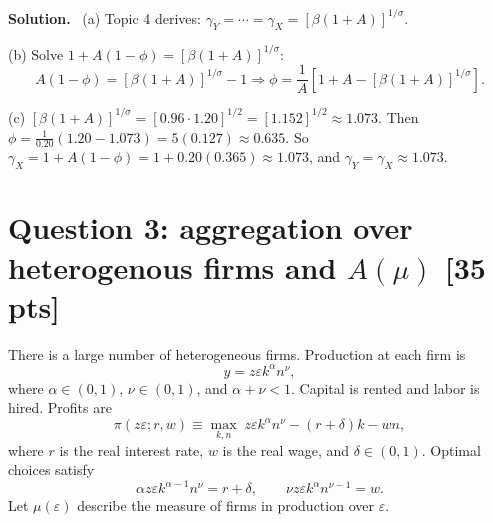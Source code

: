 \documentclass[12pt]{article}
\newenvironment{sol}{\par\medskip\noindent\textbf{Solution.}\ }{\par\medskip}
\newcommand{\pts}[1]{\hfill{\small[#1 pts]}}
\begin{document}
\begin{sol}
(a) Topic 4 derives: \(\gamma_Y=\cdots=\gamma_X=[\beta(1+A)]^{1/\sigma}\).

(b) Solve \(1+A(1-\phi)=[\beta(1+A)]^{1/\sigma}\):
\[
A(1-\phi)=[\beta(1+A)]^{1/\sigma}-1
\Rightarrow
\phi=\frac{1}{A}\left[1+A-[\beta(1+A)]^{1/\sigma}\right].
\]

(c) \([\beta(1+A)]^{1/\sigma}=[0.96\cdot 1.20]^{1/2}=[1.152]^{1/2}\approx 1.073.\)
Then \(\phi=\frac{1}{0.20}(1.20-1.073)=5(0.127)\approx 0.635.\)
So \(\gamma_X=1+A(1-\phi)=1+0.20(0.365)\approx 1.073\), and \(\gamma_Y=\gamma_X\approx 1.073.\)
\end{sol}

\section*{Question 3: aggregation over heterogenous firms and \(A(\mu)\) \pts{35}}

There is a large number of heterogeneous firms. Production at each firm is
\[
y = z\varepsilon k^{\alpha}n^{\nu},
\tag{1}
\]
where \(\alpha\in(0,1)\), \(\nu\in(0,1)\), and \(\alpha+\nu<1\).
Capital is rented and labor is hired. Profits are
\[
\pi(z\varepsilon;r,w)\equiv \max_{k,n}\; z\varepsilon k^{\alpha}n^{\nu}-(r+\delta)k-wn,
\tag{2}
\]
where \(r\) is the real interest rate, \(w\) is the real wage, and \(\delta\in(0,1)\).
Optimal choices satisfy
\[
\alpha z\varepsilon k^{\alpha-1}n^{\nu}=r+\delta,
\qquad
\nu z\varepsilon k^{\alpha}n^{\nu-1}=w.
\]
Let \(\mu(\varepsilon)\) describe the measure of firms in production over \(\varepsilon\).
\end{document}
